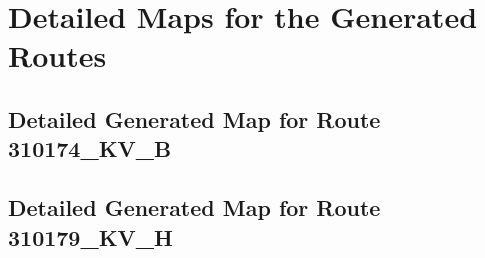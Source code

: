 






















\chapter{Detailed Maps for the Generated Routes} %
\label{cha:detailed_maps_for_the_generated_routes}

\section{Detailed Generated Map for Route 310174\_KV\_B} %
\label{sec:detailed_generated_map_for_route_310174_kv_b}




\section{Detailed Generated Map for Route 310179\_KV\_H} %
\label{sec:detailed_generated_map_for_route_310179_kv_h}




